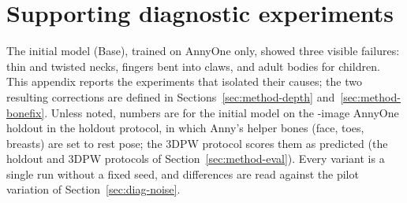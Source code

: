 
\ifdefined\DiagNumbersLoaded\else\fi
\providecommand{\DiagPending}[2][0.6\linewidth]{%
  \fbox{\parbox[c][2.6cm][c]{#1}{\centering\small\textbf{Figure pending}\\[2pt] #2}}}

\chapter{Supporting diagnostic experiments}
\label{ch:diagnostics}

The initial model (Base), trained on AnnyOne only, showed three visible failures: thin and twisted necks, fingers
bent into claws, and adult bodies for children. This appendix reports the experiments that isolated their causes; the two resulting
corrections are defined in Sections~\ref{sec:method-depth} and~\ref{sec:method-bonefix}. Unless noted, numbers are for
the initial model on the \DiagHoldoutImages-image AnnyOne holdout in the holdout protocol, in which Anny's helper bones (face, toes, breasts)
are set to rest pose; the 3DPW protocol scores them as predicted (the holdout and 3DPW protocols of
Section~\ref{sec:method-eval}). Every
variant is a single run without a fixed seed, and differences are read against the pilot variation of
Section~\ref{sec:diag-noise}.


